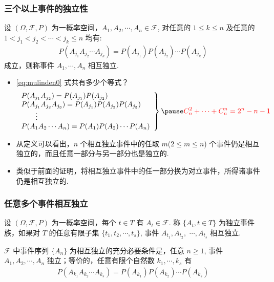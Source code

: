 \begin{frame}
	\frametitle{三个以上事件的独立性}
	\begin{defi}
		设 $(\Omega,\mathcal{F}, P)$ 为一概率空间，$A_1,A_2,\cdots,A_n\in\mathcal{F}$, 对任意的 $1\le k\le n$ 及任意的 $1< j_1<j_2<\cdots<j_k\leq n$ 均有:
		\begin{eqnarray}\label{eq:mulinden0}
			P(A_{j_1}A_{j_2}\cdots A_{j_k})=P(A_{j_1})P(A_{j_2})\cdots P(A_{j_k})
		\end{eqnarray}
		成立，则称事件 $A_1,\cdots, A_n$ 相互独立.
	\end{defi}
	\pause
	\begin{itemize}[<+-|alert@+>]
		\item \eqref{eq:mulinden0} 式共有多少个等式？\pause
		\begin{eqnarray}
			\label{eq:mulinden}
			\left.\begin{array}{l}
				P(A_{j_1}A_{j_2})=P(A_{j_1})P(A_{j_2})\\
				P(A_{j_1}A_{j_2}A_{j_3})=P(A_{j_1})P(A_{j_2})P(A_{j_3}) \\
				\qquad \vdots\\
				P(A_1A_2\cdots A_n)=P(A_1)P(A_2)\cdots P(A_n)
			\end{array}\right\} \pause \textcolor{red}{C_n^2+\cdots+C_n^n=2^n-n-1}
		\end{eqnarray}
		\pause
		\item 从定义可以看出，$n$ 个相互独立事件中的任取 $m$($2\le m\le n$) 个事件仍是相互独立的，而且任意一部分与另一部分也是独立的.
		\item 类似于前面的证明，将相互独立事件中的任一部分换为对立事件，所得诸事件仍是相互独立的.
	\end{itemize}



\end{frame}

\begin{frame}
	\frametitle{任意多个事件相互独立}
	\begin{defi}
		设 $(\Omega,\mathcal{F}, P)$ 为一概率空间，每个 $t\in T$ 有 $A_t\in \mathcal{F}$. 称 $\{A_t, t\in T\}$ 为独立事件族，如果对 $T$ 的任意有限子集 $\{t_1,t_2,\cdots, t_s\}$, 事件 $A_{t_1}, A_{t_2},$ $\cdots, A_{t_s}$ 相互独立.
	\end{defi}


	\vspace{0.8cm}
	\pause
	\begin{exam}
		$\mathcal{F}$ 中事件序列 $\{A_n\}$ 为相互独立的充分必要条件是，任意 $n\geq 1$, 事件 $A_1,A_2, \cdots, A_n$ 独立；等价的，任意有限个自然数 $k_1,\cdots, k_s$ 有
		\begin{eqnarray*}
			P(A_{k_1}A_{k_2}\cdots A_{k_s})=P(A_{k_1})P(A_{k_2})\cdots P(A_{k_s})
		\end{eqnarray*}

	\end{exam}

\end{frame}


